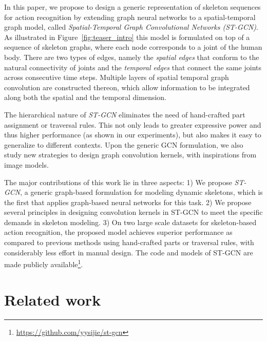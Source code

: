 \documentclass[letterpaper]{article} \usepackage{aaai18}  \usepackage{times}  \usepackage{helvet}  \usepackage{courier}  \usepackage{url}  \usepackage{graphicx}
\begin{document}
In this paper, we propose to design a generic representation of skeleton
sequences for action recognition by extending graph neural networks
to a spatial-temporal graph model,
called \emph{Spatial-Temporal Graph Convolutional Networks (ST-GCN)}.
As illustrated in Figure~\ref{fig:teaser_intro}
this model is formulated on top of a sequence of skeleton graphs,
where each node corresponds to a joint of the human body. There are
two types of edges, namely the \emph{spatial edges} that conform to the
natural connectivity of joints and the \emph{temporal edges} that
connect the same joints across consecutive time steps.
Multiple layers of spatial temporal graph convolution
are constructed thereon, which allow information to be integrated
along both the spatial and the temporal dimension.

The hierarchical nature of \emph{ST-GCN} eliminates the need of hand-crafted
part assignment or traversal rules. This not only leads to greater
expressive power and thus higher performance (as shown in our experiments),
but also makes it easy to generalize to different contexts.
Upon the generic GCN formulation, we also study new strategies to
design graph convolution kernels, with inspirations from image models.

The major contributions of this work lie in three aspects:
1) We propose \emph{ST-GCN}, a generic graph-based formulation
for modeling dynamic skeletons, which is the first that applies graph-based
neural networks for this task.
2) We propose several principles in designing convolution kernels in ST-GCN
to meet the specific demands in skeleton modeling.
3) On two large scale datasets for skeleton-based action
recognition, the proposed model achieves superior performance
as compared to previous methods using hand-crafted parts or traversal rules, with considerably less effort in manual design.
The code and models of ST-GCN are made publicly available\footnote{\url{https://github.com/yysijie/st-gcn}}.

\section{Related work}
\end{document}
